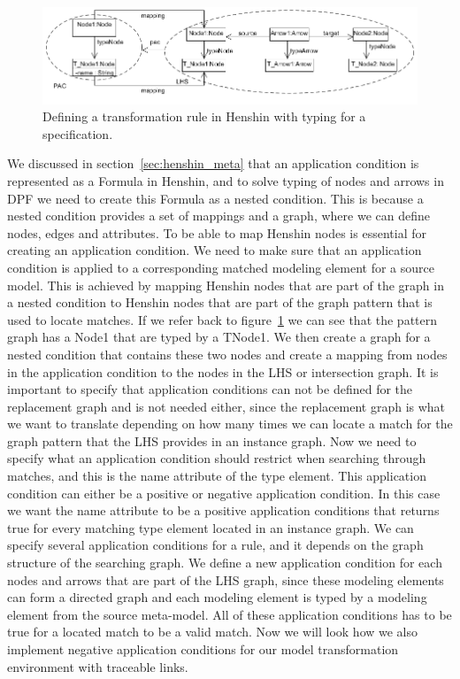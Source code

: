 \begin{figure}[H] 
	\centering
	\includegraphics[scale=0.7]{./Figures/PAC_to_Henshin.png}
	\caption[How to handle node types for a rule in Henshin]
	{Defining a transformation rule in Henshin with typing for a
	specification.}
	\label{fig:pac_henshin_condition}
\end{figure}

We discussed in section~\ref{sec:henshin_meta} that an application condition is
represented as a Formula in Henshin, and to solve typing of nodes and arrows in
DPF we need to create this Formula as a nested condition. This is because a
nested condition provides a set of mappings and a graph, where we can define
nodes, edges and attributes. To be able to map Henshin nodes is essential for
creating an application condition. We need to make sure that an application
condition is applied to a corresponding matched modeling element for a source
model. This is achieved by mapping Henshin nodes that are part of the graph in a
nested condition to Henshin nodes that are part of the graph pattern that
is used to locate matches. If we refer back to
figure~\ref{fig:pac_henshin_condition} we can see that the pattern graph has a
Node1 that are typed by a T\textunderscore Node1. We then create a graph for a
nested condition that contains these two nodes and create a mapping from nodes
in the application condition to the nodes in the LHS or intersection graph. It
is important to specify that application conditions can not be defined for the
replacement graph and is not needed either, since the replacement graph is what
we want to translate depending on how many times we can locate a match for the
graph pattern that the LHS provides in an instance graph. Now we need to specify
what an application condition should restrict when searching through matches,
and this is the name attribute of the type element. This application condition
can either be a positive or negative application condition. In this case we want
the name attribute to be a positive application conditions that returns true for
every matching type element located in an instance graph. We can specify
several application conditions for a rule, and it depends on the graph structure
of the searching graph. We define a new application condition for each nodes and
arrows that are part of the LHS graph, since these modeling elements can form a
directed graph and each modeling element is typed by a modeling element from the
source meta-model. All of these application conditions has to be true for a
located match to be a valid match. Now we will look how we also implement
negative application conditions for our model transformation environment with
traceable links. 

